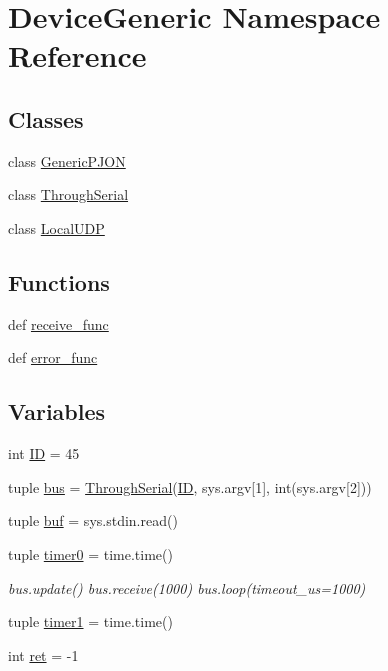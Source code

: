 \hypertarget{namespaceDeviceGeneric}{\section{Device\-Generic Namespace Reference}
\label{namespaceDeviceGeneric}
}
\subsection*{Classes}
\begin{DoxyCompactItemize}
\item 
class \hyperlink{classDeviceGeneric_1_1GenericPJON}{Generic\-P\-J\-O\-N}
\item 
class \hyperlink{classDeviceGeneric_1_1ThroughSerial}{Through\-Serial}
\item 
class \hyperlink{classDeviceGeneric_1_1LocalUDP}{Local\-U\-D\-P}
\end{DoxyCompactItemize}
\subsection*{Functions}
\begin{DoxyCompactItemize}
\item 
def \hyperlink{namespaceDeviceGeneric_a740180b8e7ba2291a07d9624fa8ec3c7}{receive\-\_\-func}
\item 
def \hyperlink{namespaceDeviceGeneric_a96f1d3b4a85bc641b50c041a12efa461}{error\-\_\-func}
\end{DoxyCompactItemize}
\subsection*{Variables}
\begin{DoxyCompactItemize}
\item 
int \hyperlink{namespaceDeviceGeneric_a40607bde9a8451d26d9e95c719722c14}{I\-D} = 45
\item 
tuple \hyperlink{namespaceDeviceGeneric_a084e2a9b523bbda45d571ea99fee0f31}{bus} = \hyperlink{classDeviceGeneric_1_1ThroughSerial}{Through\-Serial}(\hyperlink{namespaceDeviceGeneric_a40607bde9a8451d26d9e95c719722c14}{I\-D}, sys.\-argv\mbox{[}1\mbox{]}, int(sys.\-argv\mbox{[}2\mbox{]}))
\item 
tuple \hyperlink{namespaceDeviceGeneric_a71165b95b92225bdd6d08b826c521c8b}{buf} = sys.\-stdin.\-read()
\item 
tuple \hyperlink{namespaceDeviceGeneric_abd02f36eb5b20b6fcd71492463785563}{timer0} = time.\-time()
\begin{DoxyCompactList}\small\item\em bus.\-update() bus.\-receive(1000) bus.\-loop(timeout\-\_\-us=1000) \end{DoxyCompactList}\item 
tuple \hyperlink{namespaceDeviceGeneric_a8d2a2f778d4e748f1bd1b6c3d91d8a46}{timer1} = time.\-time()
\item 
int \hyperlink{namespaceDeviceGeneric_a8c6074f36f68d72fd1c72fcb62cca169}{ret} = -\/1
\end{DoxyCompactItemize}


